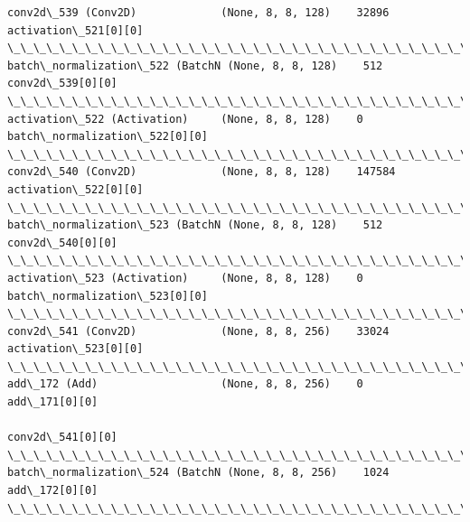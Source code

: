 \documentclass[11pt]{article}
\begin{document}
\begin{Verbatim}[commandchars=\\\{\}]
conv2d\_539 (Conv2D)             (None, 8, 8, 128)    32896       activation\_521[0][0]             
\_\_\_\_\_\_\_\_\_\_\_\_\_\_\_\_\_\_\_\_\_\_\_\_\_\_\_\_\_\_\_\_\_\_\_\_\_\_\_\_\_\_\_\_\_\_\_\_\_\_\_\_\_\_\_\_\_\_\_\_\_\_\_\_\_\_\_\_\_\_\_\_\_\_\_\_\_\_\_\_\_\_\_\_\_\_\_\_\_\_\_\_\_\_\_\_\_\_
batch\_normalization\_522 (BatchN (None, 8, 8, 128)    512         conv2d\_539[0][0]                 
\_\_\_\_\_\_\_\_\_\_\_\_\_\_\_\_\_\_\_\_\_\_\_\_\_\_\_\_\_\_\_\_\_\_\_\_\_\_\_\_\_\_\_\_\_\_\_\_\_\_\_\_\_\_\_\_\_\_\_\_\_\_\_\_\_\_\_\_\_\_\_\_\_\_\_\_\_\_\_\_\_\_\_\_\_\_\_\_\_\_\_\_\_\_\_\_\_\_
activation\_522 (Activation)     (None, 8, 8, 128)    0           batch\_normalization\_522[0][0]    
\_\_\_\_\_\_\_\_\_\_\_\_\_\_\_\_\_\_\_\_\_\_\_\_\_\_\_\_\_\_\_\_\_\_\_\_\_\_\_\_\_\_\_\_\_\_\_\_\_\_\_\_\_\_\_\_\_\_\_\_\_\_\_\_\_\_\_\_\_\_\_\_\_\_\_\_\_\_\_\_\_\_\_\_\_\_\_\_\_\_\_\_\_\_\_\_\_\_
conv2d\_540 (Conv2D)             (None, 8, 8, 128)    147584      activation\_522[0][0]             
\_\_\_\_\_\_\_\_\_\_\_\_\_\_\_\_\_\_\_\_\_\_\_\_\_\_\_\_\_\_\_\_\_\_\_\_\_\_\_\_\_\_\_\_\_\_\_\_\_\_\_\_\_\_\_\_\_\_\_\_\_\_\_\_\_\_\_\_\_\_\_\_\_\_\_\_\_\_\_\_\_\_\_\_\_\_\_\_\_\_\_\_\_\_\_\_\_\_
batch\_normalization\_523 (BatchN (None, 8, 8, 128)    512         conv2d\_540[0][0]                 
\_\_\_\_\_\_\_\_\_\_\_\_\_\_\_\_\_\_\_\_\_\_\_\_\_\_\_\_\_\_\_\_\_\_\_\_\_\_\_\_\_\_\_\_\_\_\_\_\_\_\_\_\_\_\_\_\_\_\_\_\_\_\_\_\_\_\_\_\_\_\_\_\_\_\_\_\_\_\_\_\_\_\_\_\_\_\_\_\_\_\_\_\_\_\_\_\_\_
activation\_523 (Activation)     (None, 8, 8, 128)    0           batch\_normalization\_523[0][0]    
\_\_\_\_\_\_\_\_\_\_\_\_\_\_\_\_\_\_\_\_\_\_\_\_\_\_\_\_\_\_\_\_\_\_\_\_\_\_\_\_\_\_\_\_\_\_\_\_\_\_\_\_\_\_\_\_\_\_\_\_\_\_\_\_\_\_\_\_\_\_\_\_\_\_\_\_\_\_\_\_\_\_\_\_\_\_\_\_\_\_\_\_\_\_\_\_\_\_
conv2d\_541 (Conv2D)             (None, 8, 8, 256)    33024       activation\_523[0][0]             
\_\_\_\_\_\_\_\_\_\_\_\_\_\_\_\_\_\_\_\_\_\_\_\_\_\_\_\_\_\_\_\_\_\_\_\_\_\_\_\_\_\_\_\_\_\_\_\_\_\_\_\_\_\_\_\_\_\_\_\_\_\_\_\_\_\_\_\_\_\_\_\_\_\_\_\_\_\_\_\_\_\_\_\_\_\_\_\_\_\_\_\_\_\_\_\_\_\_
add\_172 (Add)                   (None, 8, 8, 256)    0           add\_171[0][0]                    
                                                                 conv2d\_541[0][0]                 
\_\_\_\_\_\_\_\_\_\_\_\_\_\_\_\_\_\_\_\_\_\_\_\_\_\_\_\_\_\_\_\_\_\_\_\_\_\_\_\_\_\_\_\_\_\_\_\_\_\_\_\_\_\_\_\_\_\_\_\_\_\_\_\_\_\_\_\_\_\_\_\_\_\_\_\_\_\_\_\_\_\_\_\_\_\_\_\_\_\_\_\_\_\_\_\_\_\_
batch\_normalization\_524 (BatchN (None, 8, 8, 256)    1024        add\_172[0][0]                    
\_\_\_\_\_\_\_\_\_\_\_\_\_\_\_\_\_\_\_\_\_\_\_\_\_\_\_\_\_\_\_\_\_\_\_\_\_\_\_\_\_\_\_\_\_\_\_\_\_\_\_\_\_\_\_\_\_\_\_\_\_\_\_\_\_\_\_\_\_\_\_\_\_\_\_\_\_\_\_\_\_\_\_\_\_\_\_\_\_\_\_\_\_\_\_\_\_\_

\end{Verbatim}
\end{document}
